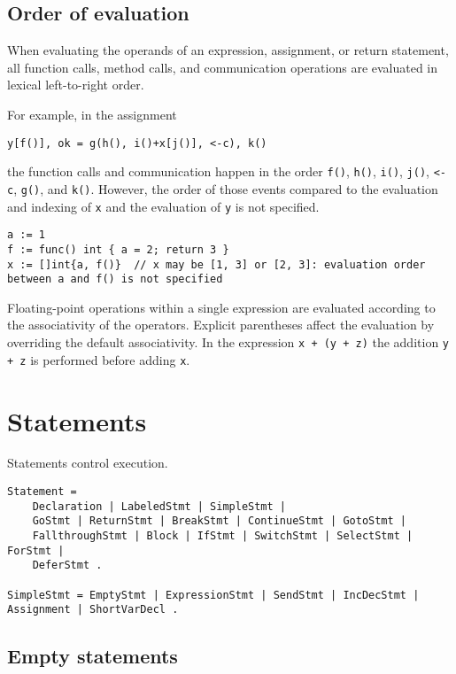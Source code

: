 \subsection*{Order of evaluation}

When evaluating the operands of an expression,
assignment, or
return statement, all function calls,
method calls, and communication operations are evaluated in lexical
left-to-right order.

For example, in the assignment

\begin{Verbatim}[frame=single]
y[f()], ok = g(h(), i()+x[j()], <-c), k()
\end{Verbatim}

the function calls and communication happen in the order \texttt{f()},
\texttt{h()}, \texttt{i()}, \texttt{j()}, \texttt{\textless{}-c},
\texttt{g()}, and \texttt{k()}. However, the order of those events
compared to the evaluation and indexing of \texttt{x} and the evaluation
of \texttt{y} is not specified.

\begin{Verbatim}[frame=single]
a := 1
f := func() int { a = 2; return 3 }
x := []int{a, f()}  // x may be [1, 3] or [2, 3]: evaluation order between a and f() is not specified
\end{Verbatim}

Floating-point operations within a single expression are evaluated
according to the associativity of the operators. Explicit parentheses
affect the evaluation by overriding the default associativity. In the
expression \texttt{x + (y + z)} the addition \texttt{y + z} is performed
before adding \texttt{x}.

\section*{Statements}

Statements control execution.

\begin{Verbatim}[frame=single]
Statement =
    Declaration | LabeledStmt | SimpleStmt |
    GoStmt | ReturnStmt | BreakStmt | ContinueStmt | GotoStmt |
    FallthroughStmt | Block | IfStmt | SwitchStmt | SelectStmt | ForStmt |
    DeferStmt .

SimpleStmt = EmptyStmt | ExpressionStmt | SendStmt | IncDecStmt | Assignment | ShortVarDecl .
\end{Verbatim}

\subsection*{Empty statements}

